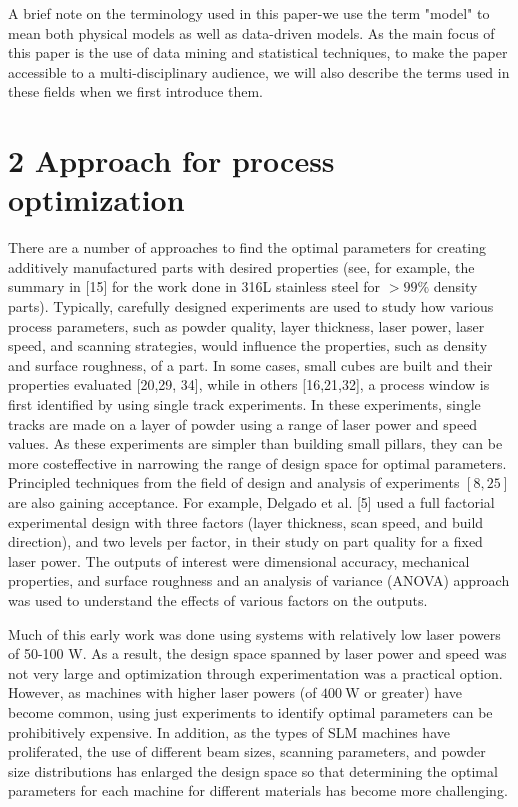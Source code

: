 \documentclass[10pt]{article}
\begin{document}
A brief note on the terminology used in this paper-we use the term "model" to mean both physical models as well as data-driven models. As the main focus of this paper is the use of data mining and statistical techniques, to make the paper accessible to a multi-disciplinary audience, we will also describe the terms used in these fields when we first introduce them.

\section*{2 Approach for process optimization}
There are a number of approaches to find the optimal parameters for creating additively manufactured parts with desired properties (see, for example, the summary in [15] for the work done in 316L stainless steel for $>99 \%$ density parts). Typically, carefully designed experiments are used to study how various process parameters, such as powder quality, layer thickness, laser power, laser speed, and scanning strategies, would influence the properties, such as density and surface roughness, of a part. In some cases, small cubes are built and their properties evaluated [20,29, 34], while in others [16,21,32], a process window is first identified by using single track experiments. In these experiments, single tracks are made on a layer of powder using a range of laser power and speed values. As these experiments are simpler than building small pillars, they can be more costeffective in narrowing the range of design space for optimal parameters. Principled techniques from the field of design and analysis of experiments $[8,25]$ are also gaining acceptance. For example, Delgado et al. [5] used a full factorial experimental design with three factors (layer thickness, scan speed, and build direction), and two levels per factor, in their study on part quality for a fixed laser power. The outputs of interest were dimensional accuracy, mechanical properties, and surface roughness and an analysis of variance (ANOVA) approach was used to understand the effects of various factors on the outputs.

Much of this early work was done using systems with relatively low laser powers of 50-100 W. As a result, the design space spanned by laser power and speed was not very large and optimization through experimentation was a practical option. However, as machines with higher laser powers (of $400 \mathrm{~W}$ or greater) have become common, using just experiments to identify optimal parameters can be prohibitively expensive. In addition, as the types of SLM machines have proliferated, the use of different beam sizes, scanning parameters, and powder size distributions has enlarged the design space so that determining the optimal parameters for each machine for different materials has become more challenging.
\end{document}
